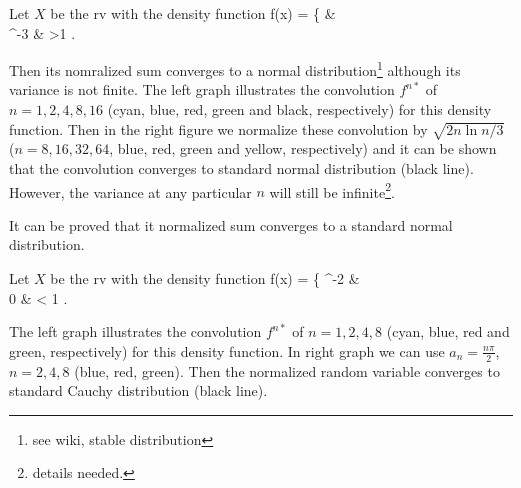 \begin{example}
Let $X$ be the rv with the density function
\be
f(x) = \left\{
 &  \\
 ^{-3} \quad\quad & >1
\ea\right.
\ee

Then its nomralized sum converges to a normal distribution\footnote{see wiki, stable distribution} although its variance is not finite. The left graph illustrates the convolution $f^{n*}$ of $n=1,2,4,8,16$ (cyan, blue, red, green and black, respectively) for this density function. Then in the right figure we normalize these convolution by $\sqrt{2n\ln n /3}$ ($n=8,16,32,64$, blue, red, green and yellow, respectively) and it can be shown that the convolution converges to standard normal distribution (black line). However, the variance at any particular $n$ will still be infinite\footnote{details needed.}.
\begin{figure}[thb]
\centering
{}
\hspace{-1cm}
\end{figure}

It can be proved that it normalized sum converges to a standard normal distribution. 
\end{example}

\begin{example}

Let $X$ be the rv with the density function
\be
f(x) = \left\{
 ^{-2} \quad\quad &  \\
0  & < 1 
\ea\right.
\ee

The left graph illustrates the convolution $f^{n*}$ of $n=1,2,4,8$ (cyan, blue, red and green, respectively) for this density function. In right graph
we can use $a_n = \frac{n\pi}{2}$, $n=2,4,8$ (blue, red, green). Then the normalized random variable converges to standard Cauchy distribution (black line).

\begin{figure}[thb]
\centering
{}
\hspace{-1cm}
\end{figure}
\end{example}


